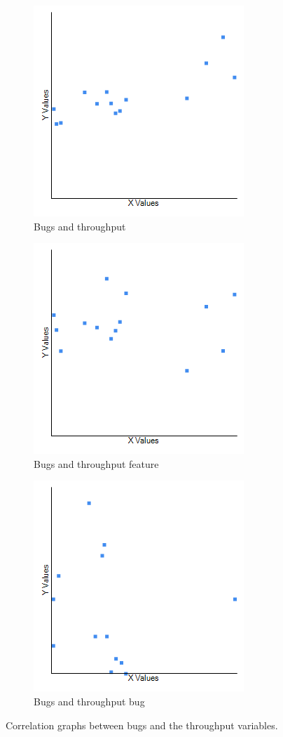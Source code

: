 \documentclass[UKenglish]{ifimaster}  %
\begin{document}
\begin{figure}[h] 
  \begin{subfigure}[b]{0.3\textwidth}
  \center
\includegraphics[scale=0.5]{Picture/Two/BugVSTP.png}
 \caption{Bugs and throughput} 
 \label{fig:a:2}
  \end{subfigure}
  \begin{subfigure}[b]{0.3\textwidth}
  \center
\includegraphics[scale=0.5]{Picture/Two/BugVSTPFT.png}
 \caption{Bugs and throughput feature} 
\label{fig:b:2}
  \end{subfigure}
  \begin{subfigure}[b]{0.3\textwidth}
  \center
\includegraphics[scale=0.5]{Picture/Eight/LTvsChurnB.png}
 \caption{Bugs and throughput bug} 
\label{fig:c:2}
  \end{subfigure}
\caption{Correlation graphs between bugs and the throughput variables.}
\label{corr:Difference:2}
\end{figure}
\end{document}
